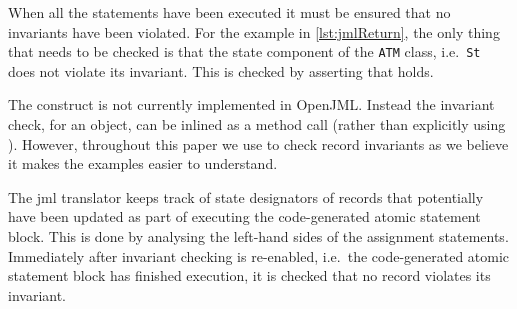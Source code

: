 When all the statements have been executed it must be ensured that no
invariants have been violated. For the example in
\autoref{lst:jmlReturn}, the only thing that needs to be checked is
that the state component of the \texttt{ATM} class, i.e.\ \texttt{St}
does not violate its invariant. This is checked by asserting that
 holds.


%
%

The \invariantfor construct is not currently implemented in
OpenJML. Instead the invariant check, for an object, can be inlined as
a method call (rather than explicitly using \invariantfor). However,
throughout this paper we use \invariantfor to check record invariants
as we believe it makes the examples easier to understand.

The \ac{jml} translator keeps track of state designators of records
that potentially have been updated as part of executing the
code-generated atomic statement block. This is done by analysing the
left-hand sides of the assignment statements. Immediately after
invariant checking is re-enabled, i.e.\ the code-generated atomic
statement block has finished execution, it is checked that no record
violates its invariant.

